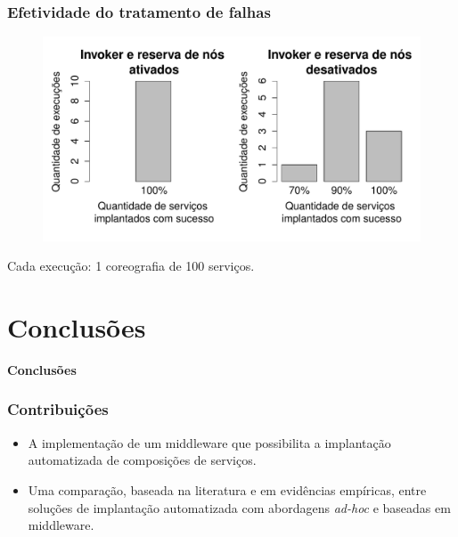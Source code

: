 \documentclass{beamer}
\newcommand\adhoc{\emph{ad-hoc}\xspace}
\newcommand\sectiontitle[1]{\begin{center}\huge\textbf{#1}\end{center}}
\begin{document}
\begin{frame}
\frametitle{Efetividade do tratamento de falhas}

\begin{figure}
\includegraphics[width=0.9\linewidth]{img/error_handling}
\end{figure}

Cada execução: 1 coreografia de 100 serviços.

\end{frame}



\section{Conclusões}

\begin{frame}

\sectiontitle{Conclusões}

\end{frame}



\begin{frame}
\frametitle{Contribuições}

\begin{itemize}
\item A implementação de um middleware que possibilita a implantação automatizada de composições de serviços. 
\item Uma comparação, baseada na literatura e em evidências empíricas, entre soluções de implantação automatizada com abordagens \adhoc e baseadas em middleware.
\end{itemize}

\end{frame}

\end{document}
